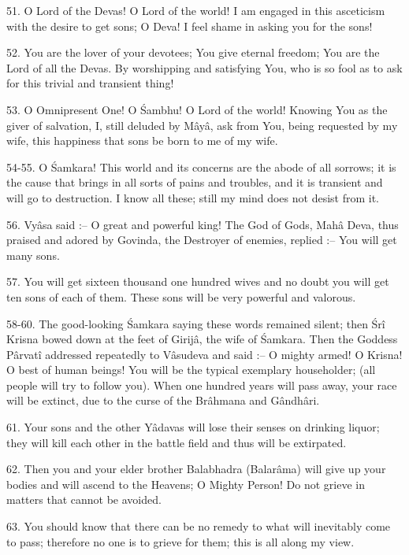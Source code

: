 51. O Lord of the Devas! O Lord of the world! I am engaged in this asceticism with the desire to get sons; O Deva! I feel shame in asking you for the sons!

52. You are the lover of your devotees; You give eternal freedom; You are the Lord of all the Devas. By worshipping and satisfying You, who is so fool as to ask for this trivial and transient thing!

53. O Omnipresent One! O \'Sambhu! O Lord of the world! Knowing You as the giver of salvation, I, still deluded by M\^ay\^a, ask from You, being requested by my wife, this happiness that sons be born to me of my wife.

54-55. O \'Samkara! This world and its concerns are the abode of all sorrows; it is the cause that brings in all sorts of pains and troubles, and it is transient and will go to destruction. I know all these; still my mind does not desist from it.

56. Vy\^asa said :-- O great and powerful king! The God of Gods, Mah\^a Deva, thus praised and adored by Govinda, the Destroyer of enemies, replied :-- You will get many sons.

57. You will get sixteen thousand one hundred wives and no doubt you will get ten sons of each of them. These sons will be very powerful and valorous.

58-60. The good-looking \'Samkara saying these words remained silent; then \'Sr\^i Krisna bowed down at the feet of Girij\^a, the wife of \'Samkara. Then the Goddess P\^arvat\^i addressed repeatedly to V\^asudeva and said :-- O mighty armed! O Krisna! O best of human beings! You will be the typical exemplary householder; (all people will try to follow you). When one hundred years will pass away, your race will be extinct, due to the curse of the Br\^ahmana and G\^andh\^ari.

61. Your sons and the other Y\^adavas will lose their senses on drinking liquor; they will kill each other in the battle field and thus will be extirpated\footnotemark.


62. Then you and your elder brother Balabhadra (Balar\^ama) will give up your bodies and will ascend to the Heavens; O Mighty Person! Do not grieve in matters that cannot be avoided.

63. You should know that there can be no remedy to what will inevitably come to pass; therefore no one is to grieve for them; this is all along my view.

